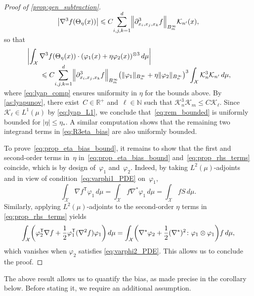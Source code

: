 \documentclass[11pt]{article}
\newcommand{\R}{\mathbb{R}}
\newcommand{\N}{\mathbb{N}}
\renewcommand{\leq}{\leqslant}
\renewcommand{\t}{\mathsf T}
\DeclarePairedDelimiter\abs{\lvert}{\rvert}
\DeclarePairedDelimiter\norm{\lVert}{\rVert}
\DeclarePairedDelimiter\paren{\lparen}{\rparen}
\theoremstyle{definition}
\begin{document}
\begin{proof}[Proof of \cref{prop:gen_subtraction}]
\begin{align}
	\abs*{\nabla^3f\paren*{\Theta_\eta(x)}} \leq C\smash{\sum_{i,j,k=1}^d}\norm*{\partial_{x_i,x_j,x_k}^3 f}_{B_m^\infty}\mathcal{K}_{n'}(x),
\end{align}
so that 
\begin{align}
	&\left|\int_\mathcal{X} \nabla^3f\paren*{\Theta_\eta(x)}\cdot (\varphi_1(x) + \eta\varphi_2(x))^{\otimes 3} \, d\mu\right| \label{eq:R3theta_err} \\
	\label{eq:rem_bounded}
&\qquad \leq C\smash{\sum_{i,j,k=1}^d}\norm*{\partial_{x_i,x_j,x_k}^3 f}_{B_m^\infty}\paren*{\norm{\varphi_1}_{B_n^\infty} + \eta\norm{\varphi_2}_{B_n^\infty}}^3\int_\mathcal{X} \mathcal{K}_n^3\mathcal{K}_{n'} \, d\mu,
\end{align}
where \eqref{eq:lyap_comp} ensures uniformity in $\eta$ for the bounds above. By \cref{as:lyapunov}, there exist~$C\in \R^+$ and~$\ell\in\N$ such that $\mathcal{K}_n^3\mathcal{K}_m \leq C\mathcal{K}_\ell$. Since $\mathcal{K}_\ell \in L^1(\mu)$ by \eqref{eq:lyap_L1}, we conclude that~\eqref{eq:rem_bounded} is uniformly bounded for $|\eta|\leq \eta_*$. A similar computation shows that the remaining two integrand terms in \eqref{eq:R3eta_bias} are also uniformly bounded. 

To prove~\eqref{eq:prop_eta_bias_bound}, it remains to show that the first and second-order terms in~$\eta$ in~\eqref{eq:prop_eta_bias_bound} and~\eqref{eq:prop_rhs_terms} coincide, which is by design of~$\varphi_1$ and~$\varphi_2$. Indeed, by taking $L^2(\mu)$-adjoints and in view of condition~\eqref{eq:varphi1_PDE} on~$\varphi_1$,
\begin{equation}
	\int_\mathcal{X} \nabla f^\t \varphi_1 \, d\mu = \int_\mathcal{X} f\nabla^* \varphi_1 \, d\mu = \int_\mathcal{X} f S \, d\mu.
\end{equation}
Similarly, applying $L^2(\mu)$-adjoints to the second-order $\eta$ terms in \eqref{eq:prop_rhs_terms} yields
\begin{align}
	\int_\mathcal{X} \paren*{\varphi_2^\t \nabla f + \frac{1}{2}\varphi_1^\t (\nabla^2f) \varphi_1} \, d\mu = \int_\mathcal{X} \paren*{\nabla^*\varphi_2 + \frac{1}{2}(\nabla^*)^2 \colon \varphi_1\otimes \varphi_1}f \, d\mu,
	\label{eq:eta2_term}
\end{align}
which vanishes when $\varphi_2$ satisfies \eqref{eq:varphi2_PDE}. This allows us to conclude the proof.
\end{proof}

The above result allows us to quantify the bias, as made precise in the corollary below. Before stating it, we require an additional assumption.
\end{document}
